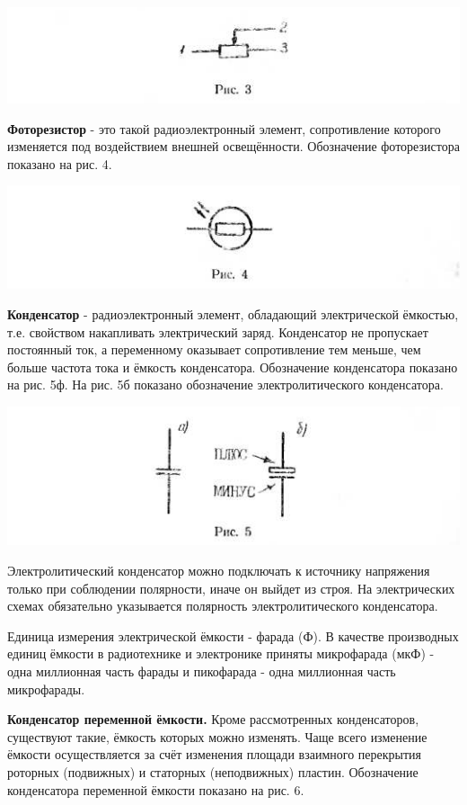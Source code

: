 \documentclass[12pt]{article}
\begin{document}
\includegraphics[scale=0.8]{ekon3_008_2}

\newpage
\textbf{Фоторезистор} - это такой радиоэлектронный элемент, сопротивление которого изменяется под воздействием внешней освещённости. Обозначение фоторезистора показано на рис. 4.

\includegraphics[width=\textwidth]{ekon3_009_1}

\textbf{Конденсатор} - радиоэлектронный элемент, обладающий электрической ёмкостью, т.е. свойством накапливать электрический заряд. Конденсатор не пропускает постоянный ток, а переменному оказывает сопротивление тем меньше, чем больше частота тока и ёмкость конденсатора. Обозначение конденсатора показано на рис. 5ф. На рис. 5б показано обозначение электролитического конденсатора.

\includegraphics[width=\textwidth]{ekon3_009_2}

Электролитический конденсатор можно подключать к источнику напряжения только при соблюдении полярности, иначе он выйдет из строя. На электрических схемах обязательно указывается полярность электролитического конденсатора.

Единица измерения электрической ёмкости - фарада (Ф). В качестве производных единиц ёмкости в радиотехнике и электронике приняты микрофарада (мкФ) - одна миллионная часть фарады и пикофарада - одна миллионная часть микрофарады.

\textbf{Конденсатор переменной ёмкости.} Кроме рассмотренных конденсаторов, существуют такие, ёмкость которых можно изменять. Чаще всего изменение ёмкости осуществляется за счёт изменения площади взаимного перекрытия роторных
\newpage
(подвижных) и статорных (неподвижных) пластин. Обозначение конденсатора переменной ёмкости показано на рис. 6.
\end{document}
